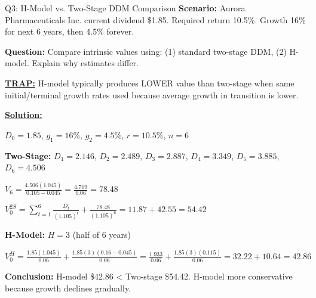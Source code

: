 \documentclass{beamer}
\renewcommand{\scriptsize}{\fontsize{6pt}{7pt}\selectfont}
\begin{document}
	\begin{frame}{Q3: H-Model vs. Two-Stage DDM Comparison}
		\scriptsize
		\textbf{Scenario:} Aurora Pharmaceuticals Inc. current dividend \$1.85. Required return 10.5\%. Growth 16\% for next 6 years, then 4.5\% forever.
		
		\textbf{Question:} Compare intrinsic values using: (1) standard two-stage DDM, (2) H-model. Explain why estimates differ.
		
		\vspace{2pt}
		\underline{\textbf{TRAP:}} H-model typically produces LOWER value than two-stage when same initial/terminal growth rates used because average growth in transition is lower.
		
		\vspace{4pt}
		\underline{\textbf{Solution:}}
		
		$D_0 = 1.85$, $g_1 = 16\%$, $g_2 = 4.5\%$, $r = 10.5\%$, $n = 6$
		
		\vspace{2pt}
		\textbf{Two-Stage:} $D_1 = 2.146$, $D_2 = 2.489$, $D_3 = 2.887$, $D_4 = 3.349$, $D_5 = 3.885$, $D_6 = 4.506$
		
		$V_6 = \frac{4.506(1.045)}{0.105-0.045} = \frac{4.709}{0.06} = 78.48$
		
		$V_0^{2S} = \sum_{t=1}^{6}\frac{D_t}{(1.105)^t} + \frac{78.48}{(1.105)^6} = 11.87 + 42.55 = 54.42$
		
		\vspace{2pt}
		\textbf{H-Model:} $H = 3$ (half of 6 years)
		
		$V_0^H = \frac{1.85(1.045)}{0.06} + \frac{1.85(3)(0.16-0.045)}{0.06} = \frac{1.933}{0.06} + \frac{1.85(3)(0.115)}{0.06} = 32.22 + 10.64 = 42.86$
		
		\vspace{2pt}
		\textbf{Conclusion:} H-model \$42.86 < Two-stage \$54.42. H-model more conservative because growth declines gradually.
	\end{frame}
	
\end{document}
